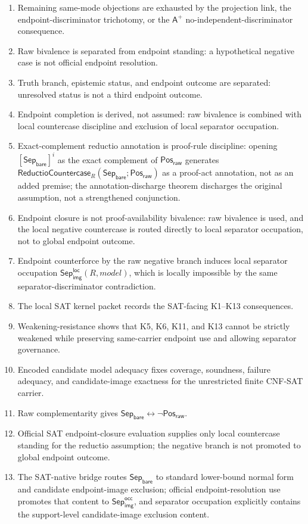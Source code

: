 \documentclass[11pt]{article}
\theoremstyle{definition}
\theoremstyle{remark}
\newcommand{\PosRaw}{\mathsf{Pos}_{\mathsf{raw}}}
\newcommand{\SepBare}{\mathsf{Sep}_{\mathsf{bare}}}
\newcommand{\SepImgOcc}{\mathsf{Sep}_{\mathsf{img}}^{\mathsf{occ}}}
\newcommand{\LocalSepImgOcc}{\mathsf{Sep}_{\mathsf{img}}^{\mathsf{loc}}}
\newcommand{\Aplus}{\mathsf{A}^{+}}
\newcommand{\ReductioCountercase}{\mathsf{ReductioCountercase}}
\begin{document}
\begin{enumerate}
\item Remaining same-mode objections are exhausted by the projection link, the endpoint-discriminator trichotomy, or the \(\Aplus\) no-independent-discriminator consequence.
\item Raw bivalence is separated from endpoint standing: a hypothetical negative case is not official endpoint resolution.
\item Truth branch, epistemic status, and endpoint outcome are separated: unresolved status is not a third endpoint outcome.
\item Endpoint completion is derived, not assumed: raw bivalence is combined with local countercase discipline and exclusion of local separator occupation.
\item Exact-complement reductio annotation is proof-rule discipline: opening \([\SepBare]^i\) as the exact complement of \(\PosRaw\) generates \(\ReductioCountercase_R(\SepBare;\PosRaw)\) as a proof-act annotation, not as an added premise; the annotation-discharge theorem discharges the original assumption, not a strengthened conjunction.
\item Endpoint closure is not proof-availability bivalence: raw bivalence is used, and the local negative countercase is routed directly to local separator occupation, not to global endpoint outcome.
\item Endpoint counterforce by the raw negative branch induces local separator occupation \(\LocalSepImgOcc(R,model)\), which is locally impossible by the same separator-discriminator contradiction.
\item The local SAT kernel packet records the SAT-facing K1--K13 consequences.
\item Weakening-resistance shows that K5, K6, K11, and K13 cannot be strictly weakened while preserving same-carrier endpoint use and allowing separator governance.
\item Encoded candidate model adequacy fixes coverage, soundness, failure adequacy, and candidate-image exactness for the unrestricted finite CNF-SAT carrier.
\item Raw complementarity gives \(\SepBare\leftrightarrow\neg\PosRaw\).
\item Official SAT endpoint-closure evaluation supplies only local countercase standing for the reductio assumption; the negative branch is not promoted to global endpoint outcome.
\item The SAT-native bridge routes \(\SepBare\) to standard lower-bound normal form and candidate endpoint-image exclusion; official endpoint-resolution use promotes that content to \(\SepImgOcc\), and separator occupation explicitly contains the support-level candidate-image exclusion content.

\end{enumerate}
\end{document}
